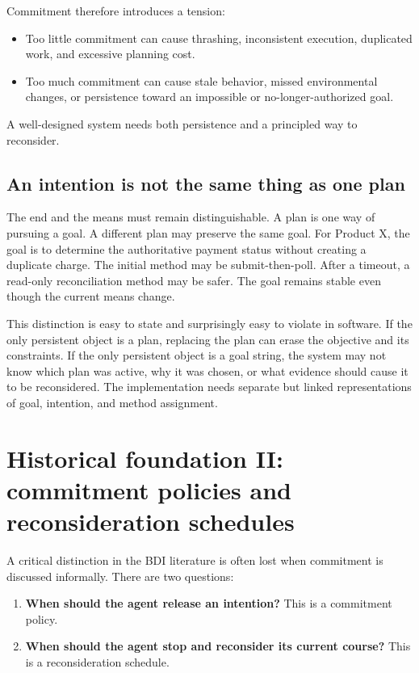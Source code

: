 Commitment therefore introduces a tension:

\begin{itemize}
  \item Too little commitment can cause thrashing, inconsistent execution, duplicated work, and excessive planning cost.
  \item Too much commitment can cause stale behavior, missed environmental changes, or persistence toward an impossible or no-longer-authorized goal.
\end{itemize}

A well-designed system needs both persistence and a principled way to reconsider.

\subsection{An intention is not the same thing as one plan}

The end and the means must remain distinguishable. A plan is one way of pursuing a goal. A different plan may preserve the same goal. For Product X, the goal is to determine the authoritative payment status without creating a duplicate charge. The initial method may be submit-then-poll. After a timeout, a read-only reconciliation method may be safer. The goal remains stable even though the current means change.

This distinction is easy to state and surprisingly easy to violate in software. If the only persistent object is a plan, replacing the plan can erase the objective and its constraints. If the only persistent object is a goal string, the system may not know which plan was active, why it was chosen, or what evidence should cause it to be reconsidered. The implementation needs separate but linked representations of goal, intention, and method assignment.

\section{Historical foundation II: commitment policies and reconsideration schedules}
\label{sec:ch15-commitment-schedules}

A critical distinction in the BDI literature is often lost when commitment is discussed informally. There are two questions:

\begin{enumerate}
  \item \textbf{When should the agent release an intention?} This is a commitment policy.
  \item \textbf{When should the agent stop and reconsider its current course?} This is a reconsideration schedule.
\end{enumerate}

